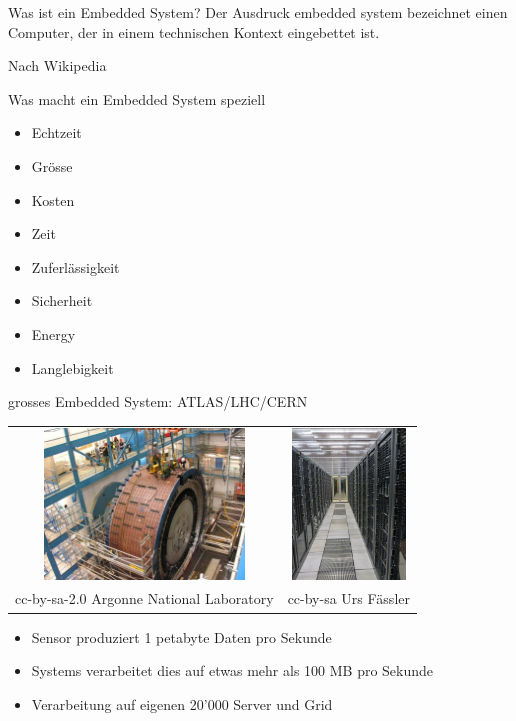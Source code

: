 \begin{frame}{Was ist ein Embedded System?}
	Der Ausdruck embedded system bezeichnet einen Computer, der in einem technischen Kontext eingebettet ist. \cite{wikiEmbedded}
	\begin{flushright}
		Nach Wikipedia
	\end{flushright}
	
	Was macht ein Embedded System speziell \cite{embeddedSpecials}
	\begin{itemize}
		\item Echtzeit
		\item Grösse
		\item Kosten
		\item Zeit
		\item Zuferlässigkeit
		\item Sicherheit
		\item Energy
		\item Langlebigkeit
	\end{itemize}
\end{frame}

\begin{frame}{grosses Embedded System: ATLAS/LHC/CERN}
	\begin{center}
		\begin{tabular}{cc}
			\includegraphics[height=4cm]{res/ATLAS_Tile_Calorimeter} &  \includegraphics[height=4cm]{res/CERN_server.jpg} \\ 
			cc-by-sa-2.0 Argonne National Laboratory & cc-by-sa Urs Fässler \\
		\end{tabular} 
	\end{center}
	\begin{itemize}
		\item Sensor produziert 1 petabyte Daten pro Sekunde
		\item Systems verarbeitet dies auf etwas mehr als 100 MB pro Sekunde \cite{wikiAtlas}
		\item Verarbeitung auf eigenen 20'000 Server und Grid \cite{wikiCernServer}
	\end{itemize}
\end{frame}

